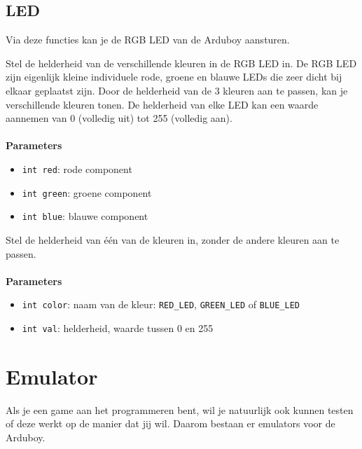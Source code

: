\documentclass[11pt,fleqn]{book} %
\begin{document}
\subsection{LED}
Via deze functies kan je de RGB LED van de Arduboy aansturen.

\begin{libf}
	Stel de helderheid van de verschillende kleuren in de RGB LED in. De RGB LED zijn eigenlijk kleine individuele rode, groene en blauwe LEDs die zeer dicht bij elkaar geplaatst zijn. Door de helderheid van de 3 kleuren aan te passen, kan je verschillende kleuren tonen. 	
	De helderheid van elke LED kan een waarde aannemen van 0 (volledig uit) tot 255 (volledig aan).\\ \\
	\textbf{Parameters}
	\begin{itemize}
		\item \texttt{int red}: rode component
		\item \texttt{int green}: groene component
		\item \texttt{int blue}: blauwe component
	\end{itemize}
\end{libf}

\begin{libf}
	Stel de helderheid van één van de kleuren in, zonder de andere kleuren aan te passen.\\ \\
	\textbf{Parameters}
	\begin{itemize}
		\item \texttt{int color}: naam van de kleur: \texttt{RED\_LED}, \texttt{GREEN\_LED} of \texttt{BLUE\_LED}
		\item \texttt{int val}: helderheid, waarde tussen 0 en 255
	\end{itemize}
\end{libf}

\newpage
\section{Emulator}
Als je een game aan het programmeren bent, wil je natuurlijk ook kunnen testen of deze werkt op de manier dat jij wil. Daarom bestaan er emulators voor de Arduboy.
\end{document}
